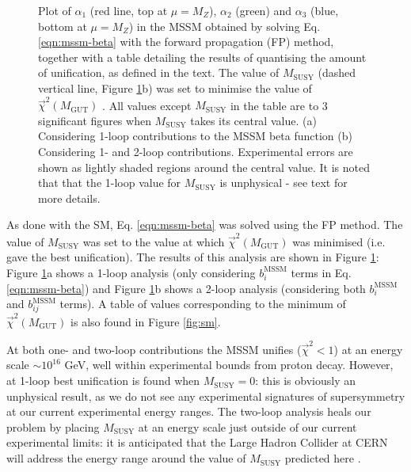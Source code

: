\documentclass[12pt,a4paper,oneside]{article}
\begin{document}
\begin{figure}[p]
\begin{center}
\caption[]{Plot of $\alpha_1$ (red line, top at $\mu = M_Z$), $\alpha_2$ (green) and $\alpha_3$ (blue, bottom at $\mu = M_Z$) in the MSSM obtained by solving Eq. \ref{eqn:mssm-beta} with the forward propagation (FP) method, together with a table detailing the results of quantising the amount of unification, as defined in the text. The value of $M_\mathrm{SUSY}$ (dashed vertical line, Figure \ref{fig:mssm-fp}b) was set to minimise the value of $\overrightarrow{\chi}^2 (M_\mathrm{GUT})$ . All values except $M_\mathrm{SUSY}$ in the table are to 3 significant figures when $M_\mathrm{SUSY}$ takes its central value. (a) Considering 1-loop contributions to the MSSM beta function (b) Considering 1- and 2-loop contributions. Experimental errors are shown as lightly shaded regions around the central value. It is noted that that the 1-loop value for $M_\mathrm{SUSY}$ is unphysical - see text for more details.}
\label{fig:mssm-fp}
\end{center}
\end{figure}

As done with the SM, Eq. \ref{eqn:mssm-beta} was solved using the FP method. The value of $M_\mathrm{SUSY}$ was set to the value at which $\overrightarrow{\chi}^2 (M_\mathrm{GUT})$ was minimised (i.e. gave the best unification). The results of this analysis are shown in Figure \ref{fig:mssm-fp}: Figure \ref{fig:mssm-fp}a shows a 1-loop analysis (only considering $b_i^\mathrm{MSSM}$ terms in Eq. \ref{eqn:mssm-beta}) and Figure \ref{fig:mssm-fp}b shows a 2-loop analysis (considering both $b_i^\mathrm{MSSM}$ and $b_{ij}^\mathrm{MSSM}$ terms). A table of values corresponding to the minimum of $\overrightarrow{\chi}^2 (M_\mathrm{GUT})$ is also found in Figure \ref{fig:sm}.

At both one- and two-loop contributions the MSSM unifies ($\overrightarrow{\chi}^2 < 1$) at an energy scale $\sim 10^{16}$ GeV, well within experimental bounds from proton decay. However, at 1-loop best unification is found when $M_\mathrm{SUSY} = 0$: this is obviously an unphysical result, as we do not see any experimental signatures of supersymmetry at our current experimental energy ranges. The two-loop analysis heals our problem by placing $M_\mathrm{SUSY}$ at an energy scale just outside of our current experimental limits: it is anticipated that the Large Hadron Collider at CERN will address the energy range around the value of $M_\mathrm{SUSY}$ predicted here \cite{lhc-1, lhc-2}.
\end{document}

